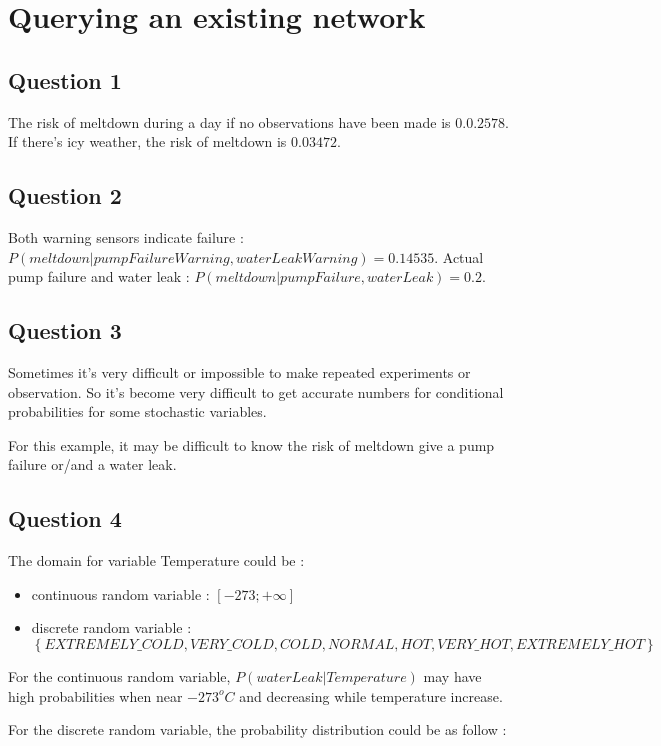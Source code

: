 \section{Querying an existing network}
  \subsection{Question 1}
The risk of meltdown during a day if no observations have been made is $0.0.2578$. If there's icy weather, the risk of meltdown is $0.03472$.

  \subsection{Question 2}
Both warning sensors indicate failure : $P(meltdown | pumpFailureWarning, waterLeakWarning) = 0.14535$. Actual pump failure and water leak : $P(meltdown | pumpFailure, waterLeak) = 0.2$.

  \subsection{Question 3}

Sometimes it's very difficult or impossible to make repeated experiments or observation. So it's become very difficult to get accurate numbers for conditional probabilities for some stochastic variables.

For this example, it may be difficult to know the risk of meltdown give a pump failure or/and a water leak.

  \subsection{Question 4}
The domain for variable Temperature could be :
\begin{itemize}
  \item continuous random variable : $[-273 ; +\infty]$ 
  \item discrete random variable : $\left\{EXTREMELY\_COLD, VERY\_COLD, COLD, NORMAL, HOT, VERY\_HOT, EXTREMELY\_HOT\right\}$
\end{itemize}

For the continuous random variable, $P(waterLeak | Temperature)$ may have high probabilities when near $-273^oC$ and decreasing while temperature increase. 

For the discrete random variable, the probability distribution could be as follow :


